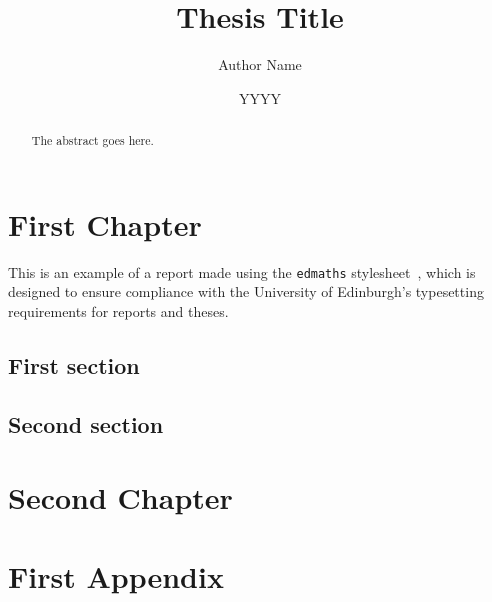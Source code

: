 \documentclass[12pt,twoside]{report}
\title{Thesis Title}
\author{Author Name}
\date{YYYY}
\begin{document}
\flushbottom
{}

\maketitle

\declaration{}

\begin{abstract}
The abstract goes here.
\end{abstract}

\dedication{In memory of my sanity.}


\tableofcontents

\newpage
{}

\chapter{First Chapter}

This is an example of a report made using the \texttt{edmaths} stylesheet~\cite{koeppe2007}, which is designed to ensure compliance with the University of Edinburgh's typesetting requirements for reports and theses.

\section{First section}

\section{Second section}


\chapter{Second Chapter}

\appendix

\chapter{First Appendix}




\end{document}
